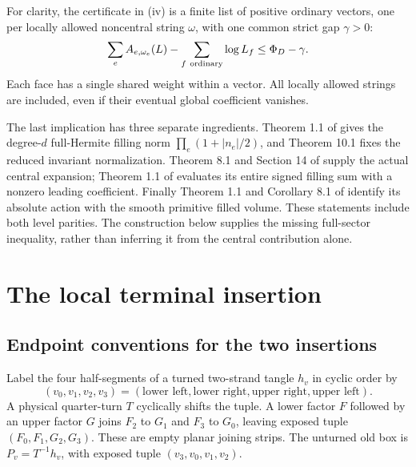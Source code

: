 \documentclass[11pt]{article}
\numberwithin{equation}{section}
\theoremstyle{definition}
\begin{document}
For clarity, the certificate in (iv) is a finite list of positive
ordinary vectors, one per locally allowed noncentral string
\(\omega\), with one common strict gap \(\gamma>0\):
\[
 \sum_e A_{e,\omega_e}(L)-\sum_{f\ {\rm ordinary}}\log L_f
       \le \Phi_D-\gamma .
\]
Each face has a single shared weight within a vector. All locally
allowed strings are included, even if their eventual global
coefficient vanishes.

The last implication has three separate ingredients. Theorem 1.1
of \cite{Finite} gives the degree-\(d\) full-Hermite filling norm
\(\prod_e(1+|n_e|/2)\), and Theorem 10.1 fixes the reduced invariant
normalization. Theorem 8.1 and Section 14 of \cite{CasimirSources} supply the
actual central expansion; Theorem 1.1 of \cite{Oscillatory}
evaluates its entire signed filling sum with a nonzero leading
coefficient. Finally Theorem 1.1 and Corollary 8.1 of \cite{Marked}
identify its absolute action with the smooth primitive filled
volume. These statements include both level parities. The
construction below supplies the missing full-sector inequality,
rather than inferring it from the central contribution alone.

\section{The local terminal insertion}\label{td:local}

\subsection{Endpoint conventions for the two insertions}

Label the four half-segments of a turned two-strand tangle \(h_v\)
in cyclic order by
\[
 (v_0,v_1,v_2,v_3)
   =(\text{lower left},\text{lower right},
      \text{upper right},\text{upper left}).
\]
A physical quarter-turn \(T\) cyclically shifts the tuple. A lower
factor \(F\) followed by an upper factor \(G\) joins \(F_2\) to
\(G_1\) and \(F_3\) to \(G_0\), leaving exposed tuple
\((F_0,F_1,G_2,G_3)\). These are empty planar joining strips.
The unturned old box is \(P_v=T^{-1}h_v\), with exposed tuple
\((v_3,v_0,v_1,v_2)\).
\end{document}
